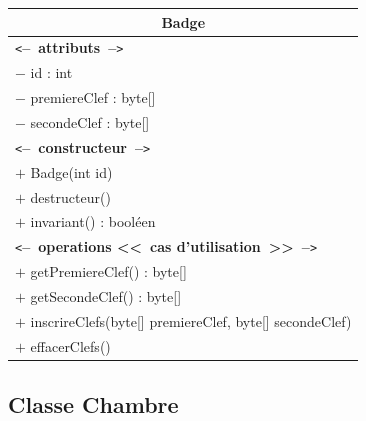 \documentclass[11pt,article]{article}
\newcommand{\cmt}[1]{\texttt{<}\textbf{--~#1~--}\texttt{>}}
\begin{document}
\begin{center}
\begin{longtable}{|p{15cm}|}
\hline
\multicolumn{1}{|c|}{{\Large \textsf{Badge}}} \\
\hline
\cmt{attributs}\\
$-$ id : int \\
$-$ premiereClef : byte[] \\
$-$ secondeClef : byte[] \\
\hline
\cmt{constructeur} \\
$+$ Badge(int id)\\
$+$ destructeur()\\
$+$ invariant() : booléen\\
\cmt{operations <<~cas d'utilisation~>>} \\
$+$ getPremiereClef() : byte[] \\
$+$ getSecondeClef() : byte[] \\
$+$ inscrireClefs(byte[] premiereClef, byte[] secondeClef) \\
$+$ effacerClefs() \\
\hline
\end{longtable}
\end{center}
\newpage

\subsection{Classe \textsf{Chambre}}
\end{document}
